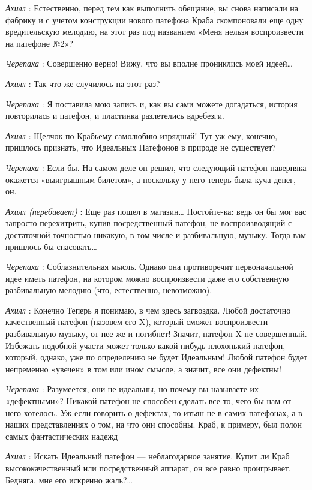\emph{Ахилл} : Естественно, перед тем как выполнить обещание, вы снова написали на фабрику и с учетом конструкции нового патефона Краба скомпоновали еще одну вредительскую мелодию, на этот раз под названием «Меня нельзя воспроизвести на патефоне №2»?

\emph{Черепаха} : Совершенно верно! Вижу, что вы вполне прониклись моей идеей\ldots{}

\emph{Ахилл} : Так что же случилось на этот раз?

\emph{Черепаха} : Я поставила мою запись и, как вы сами можете догадаться, история повторилась и патефон, и пластинка разлетелись вдребезги.

\emph{Ахилл} : Щелчок по Крабьему самолюбию изрядный! Тут уж ему, конечно, пришлось признать, что Идеальных Патефонов в природе не существует?

\emph{Черепаха} : Если бы. На самом деле он решил, что следующий патефон наверняка окажется «выигрышным билетом», а поскольку у него теперь была куча денег, он.

\emph{Ахилл (перебивает)} : Еще раз пошел в магазин\ldots{} Постойте-ка: ведь он бы мог вас запросто перехитрить, купив посредственный патефон, не воспроизводящий с достаточной точностью никакую, в том числе и разбивальную, музыку. Тогда вам пришлось бы спасовать\ldots{}

\emph{Черепаха} : Соблазнительная мысль. Однако она противоречит первоначальной идее иметь патефон, на котором можно воспроизвести даже его собственную разбивальную мелодию (что, естественно, невозможно).

\emph{Ахилл} : Конечно Теперь я понимаю, в чем здесь загвоздка. Любой достаточно качественный патефон (назовем его X), который сможет воспроизвести разбивальную музыку, от нее же и погибнет! Значит, патефон X не совершенный. Избежать подобной участи может только какой-нибудь плохонький патефон, который, однако, уже по определению не будет Идеальным! Любой патефон будет непременно «увечен» в том или ином смысле, а значит, все они дефектны!

\emph{Черепаха} : Разумеется, они не идеальны, но почему вы называете их «дефектными»? Никакой патефон не способен сделать все то, чего бы нам от него хотелось. Уж если говорить о дефектах, то изъян не в самих патефонах, а в наших представлениях о том, на что они способны. Краб, к примеру, был полон самых фантастических надежд

\emph{Ахилл} : Искать Идеальный патефон --- неблагодарное занятие. Купит ли Краб высококачественный или посредственный аппарат, он все равно проигрывает. Бедняга, мне его искренно жаль?\ldots{}

